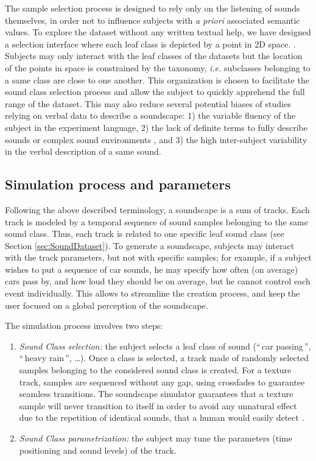 \documentclass[twoside,twocolumn]{article}
\begin{document}
The sample selection process is designed to rely only on the listening of sounds themselves, in order not to influence subjects with \textit{a priori} associated semantic values. To explore the dataset without any written textual help, we have designed a selection interface where each leaf class is depicted by a point in 2D space.  \cite{lafayJAES}. Subjects may only interact with the leaf classes of the datasets but the location of the points in space is constrained by the taxonomy, \textit{i.e.} subclasses belonging to a same class are close to one another. This organization is chosen to facilitate the sound class selection process and allow the subject to quickly apprehend the full range of the dataset. This may also reduce several potential biases of studies relying on verbal data to describe a soundscape: 1) the variable fluency of the subject in the experiment language, 2) the lack of definite terms to fully describe sounds or complex sound environments \cite{guastavino_ideal_2006}, and 3) the high inter-subject variability in the verbal description of a same sound.


\subsection{Simulation process and parameters}
\label{sec:simulationProcess}

Following the above described terminology, a soundscape is a sum of tracks. Each track is modeled by a temporal sequence of sound samples belonging to the same sound class. Thus, each track is related to one specific leaf sound class (see Section \ref{sec:SoundDataset}). To generate a soundscape, subjects may interact with the track parameters, but not with specific samples; for example, if a subject wishes to put a sequence of car sounds, he may specify how often (on average) cars pass by, and how loud they should be on average, but he cannot control each event individually. This allows to streamline the creation process, and keep the user focused on a global perception of the soundscape.

The simulation process involves two steps: 

\begin{enumerate}
\item \textit{Sound Class selection:}  the subject selects a leaf class of sound (``\,car passing\,'', ``\,heavy rain\,'', \ldots{}). Once a class is selected, a track made of randomly selected samples belonging to the considered sound class is created. For a texture track, samples are sequenced without any gap, using crossfades to guarantee seamless transitions. The soundscape simulator guarantees that a texture sample will never transition to itself in order to avoid any unnatural effect due to the repetition of identical sounds, that a human would easily detect \cite{agus_rapid_2010}.
\item \textit{Sound Class parametrization:} the subject may tune the parameters (time positioning and sound levels) of the track.
\end{enumerate}
\end{document}
